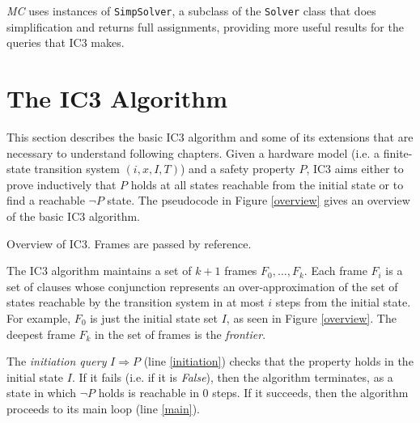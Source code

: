 \documentclass[12pt,a4paper,twoside,openright]{report}
\begin{document}
{{\emph{MC} uses instances of \verb,SimpSolver,, a subclass of the \verb,Solver, class
that does simplification and returns full assignments, providing more useful results
for the queries that IC3 makes.

\section{The IC3 Algorithm}
\label{prep:ic3}
This section describes the basic IC3 algorithm and some of its extensions that are
necessary to understand following chapters.
Given a hardware model (i.e. a finite-state transition system $(i,x,I,T)$) and a
safety property $P$, IC3 aims either to prove inductively that $P$ holds
at all states reachable from the initial state or
to find a reachable $\neg P$ state.
The pseudocode in Figure \ref{overview} gives an overview of the basic IC3 algorithm.	

\begin{algorithm}[t]
\DontPrintSemicolon
{}
\caption{Overview of IC3. Frames are passed by reference.}
\label{overview}
\end{algorithm}

The IC3 algorithm maintains a set of $k + 1$ frames $F_0,\ldots,F_k$.
Each frame $F_i$ is a set of clauses whose conjunction represents an
over-approximation of the set of states reachable by the transition
system in at most $i$ steps from the initial state.
For example, $F_0$ is just the initial state set $I$, as seen
in Figure \ref{overview}.
The deepest frame $F_k$ in the set of frames is the \emph{frontier}.

The \emph{initiation query} $I \Rightarrow P$ (line \ref{initiation}) checks that
the property holds in the initial state $I$.
If it fails (i.e. if it is {\it False}), then the algorithm terminates,
as a state in which $\neg P$ holds is reachable in 0 steps.
If it succeeds, then the algorithm proceeds to its main loop (line \ref{main}).

}}
\end{document}
